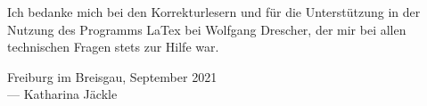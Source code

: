 Ich bedanke mich bei den Korrekturlesern und für die
Unterstützung in der Nutzung des Programms LaTex bei Wolfgang Drescher, der mir
bei allen technischen Fragen stets zur Hilfe war. 




\vspace{0.5cm}

\begin{flushright}
	{
		\small
		Freiburg im Breisgau, September 2021\\
		--- Katharina Jäckle
	}
\end{flushright}
